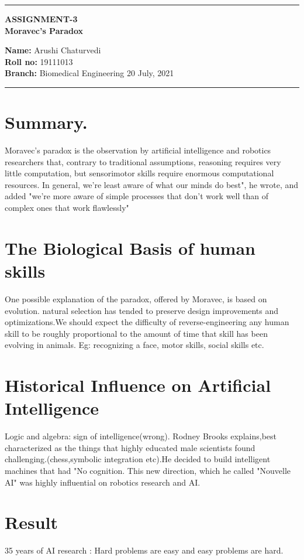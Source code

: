 \documentclass[10pt,a4paper,twoside]{article}
\begin{document}
\begin{center}
\hrule

\vspace{.4cm}
{\bf {\Large ASSIGNMENT-3 }}\\
\vspace{.3cm}
{\bf {\huge Moravec's Paradox}}
\vspace{.3cm}
\end{center}
{\bf Name:}  Arushi Chaturvedi\\
{\bf Roll no:}  19111013 \\
{\bf Branch: }  Biomedical Engineering \hspace{\fill}  20 July, 2021 \\
\hrule

\vspace{.5cm}
\section{Summary.} 

Moravec's paradox is the observation by artificial intelligence and robotics researchers that, contrary to traditional assumptions, reasoning requires very little computation, but sensorimotor skills require enormous computational resources.
In general, we're least aware of what our minds do best", he wrote, and added "we're more aware of simple processes that don't work well than of complex ones that work flawlessly"

\section{The Biological Basis of human skills}
One possible explanation of the paradox, offered by Moravec, is based on evolution. natural selection has tended to preserve design improvements and optimizations.We should expect the difficulty of reverse-engineering any human skill to be roughly proportional to the amount of time that skill has been evolving in animals.
Eg: recognizing a face, motor skills, social skills etc.


\section{Historical Influence on Artificial Intelligence}
Logic and algebra: sign of intelligence(wrong). Rodney Brooks explains,best characterized as the things that highly educated male scientists found challenging.(chess,symbolic integration etc).He decided to build intelligent machines that had "No cognition. This new direction, which he called "Nouvelle AI" was highly influential on robotics research and AI.

\section{Result}
35 years of AI research : Hard problems are easy and easy problems are hard.
\end{document}
